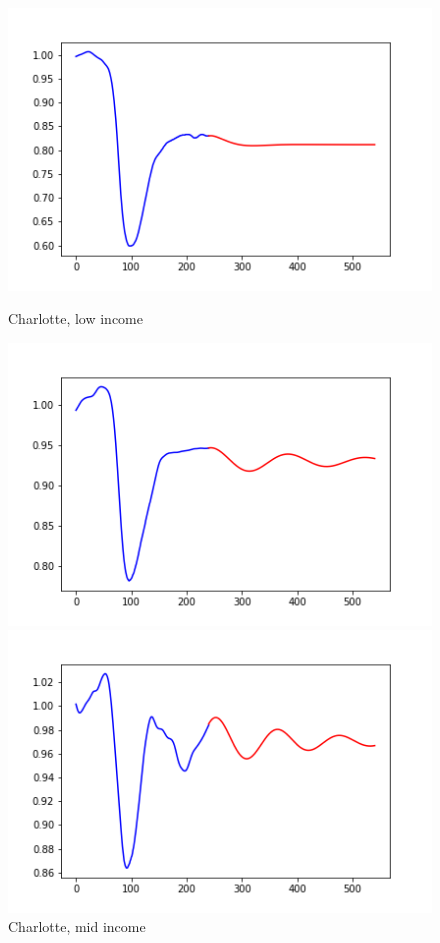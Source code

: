 \documentclass{article}
\begin{document}
\begin{figure}[ht]
\begin{minipage}[b]{0.3\linewidth}
\centering
\includegraphics[width=\textwidth]{Charlotte_lowinc_emp.png}
\caption{Charlotte, low income}
\end{minipage}
\hspace{0.5cm}
\begin{minipage}[b]{0.3\linewidth}
\centering
\includegraphics[width=\textwidth]{Charlotte_midinc_emp.png}
\caption{Charlotte, mid income}
\end{minipage}
\hspace{0.5cm}
\begin{minipage}[b]{0.3\linewidth}
\centering
\includegraphics[width=\textwidth]{Charlotte_highinc_emp.png}

\end{minipage}
\end{figure}
\end{document}
